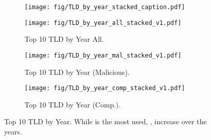 

\begin{figure*}[!t]
    \vspace{-5px}
    \centering
        \begin{subfigure}{0.8\textwidth}
            \texttt{[image: fig/TLD\_by\_year\_stacked\_caption.pdf]}
        \end{subfigure}
    \centering
    \begin{subfigure}{0.33\textwidth}
        \texttt{[image: fig/TLD\_by\_year\_all\_stacked\_v1.pdf]}
        \vspace{-10px}
        \caption{Top 10 TLD by Year All.}
        \label{fig:TLD_by_year_all_stacked}
    \end{subfigure}
    \begin{subfigure}{0.32\textwidth}
        \texttt{[image: fig/TLD\_by\_year\_mal\_stacked\_v1.pdf]}
        \vspace{-10px}
        \caption{Top 10 TLD by Year (Malicious).}
        \label{fig:TLD_by_year_mal_stacked}
    \end{subfigure}
     \begin{subfigure}{0.32\textwidth}
        \texttt{[image: fig/TLD\_by\_year\_comp\_stacked\_v1.pdf]}
        \vspace{-10px}
        \caption{Top 10 TLD by Year (Comp.).}
        \label{fig:TLD_by_year_comp_stacked}
    \end{subfigure}
    \vspace{-10px}
    \caption{Top 10 TLD by Year. While  is the most used, ,  increase over the years.}
    \label{fig:top10_TLD_by_year}
    \vspace{-10px}
\end{figure*}


